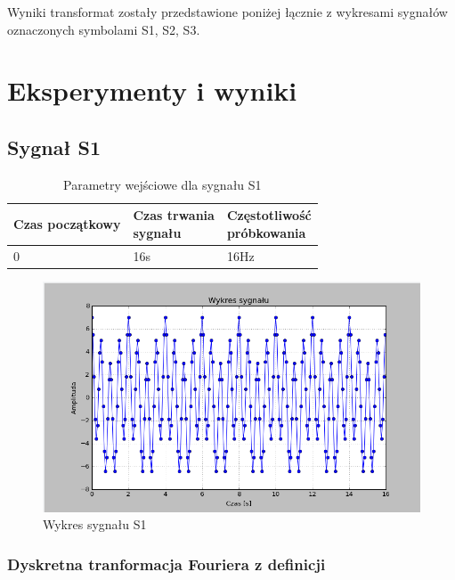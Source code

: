 \documentclass{article}
\begin{document}
        Wyniki transformat zostały przedstawione poniżej łącznie z wykresami sygnałów oznaczonych
        symbolami S1, S2, S3. 

\section{Eksperymenty i wyniki} {
    \subsection{Sygnał S1} 

        \begin{table}[h!]
            \centering
            \begin{tabular}{|l|l|l|}
                \hline
                Czas początkowy & \shortstack{Czas trwania \\ sygnału} & \shortstack{Częstotliwość\\ próbkowania}   \\ \hline
                0 & 16s & 16Hz         \\ \hline
            \end{tabular}
            \caption{Parametry wejściowe dla sygnału S1}
        \end{table}

        \begin{figure}[h!]
            \centering
            \includegraphics[width=\textwidth]{img/S1.png}
            \caption{Wykres sygnału S1}
        \end{figure}
        \FloatBarrier

        \subsubsection{Dyskretna tranformacja Fouriera z definicji}

}
\end{document}
